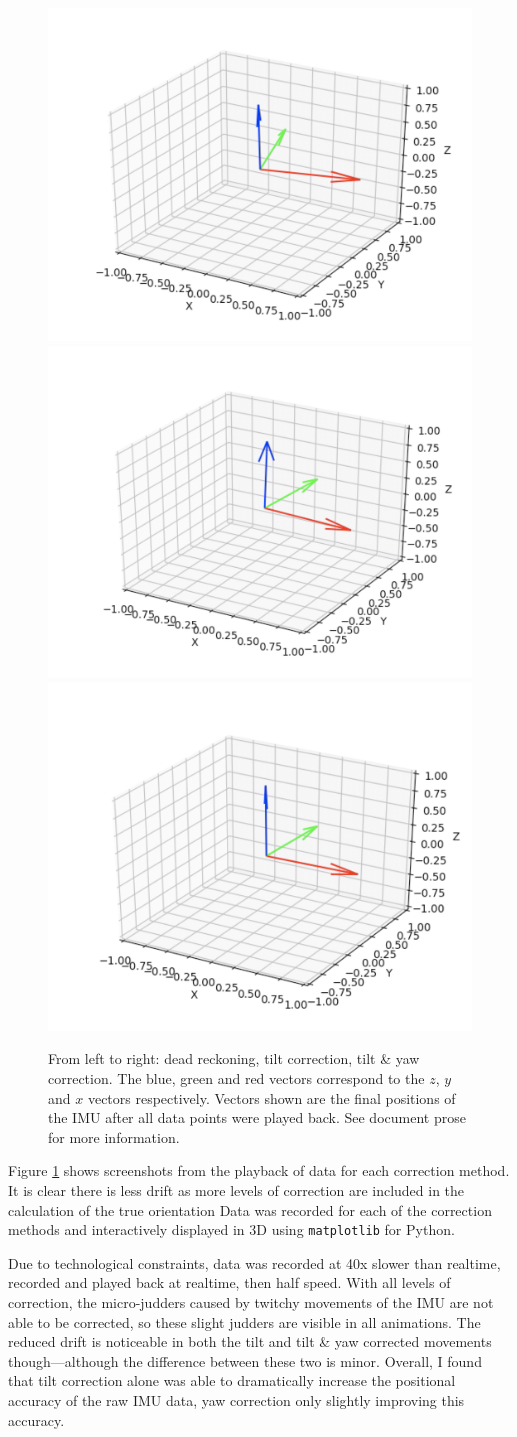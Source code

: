 \documentclass[11pt]{article}
\begin{document}
\begin{figure}[htp]

\centering
\includegraphics[width=.32\textwidth]{4gyro_after}\hfill
\includegraphics[width=.32\textwidth]{5acc_after}\hfill
\includegraphics[width=.32\textwidth]{6mag_after}

\caption{From left to right: dead reckoning, tilt correction, tilt \& yaw correction. The blue, green and red vectors correspond to the $z$, $y$ and $x$ vectors respectively. Vectors shown are the final positions of the IMU after all data points were played back. See document prose for more information.}
\label{fig:3d}

\end{figure}

Figure \ref{fig:3d} shows screenshots from the playback of data for each correction method. It is clear there is less drift as more levels of correction are included in the calculation of the true orientation Data was recorded for each of the correction methods and interactively displayed in 3D using \texttt{matplotlib} for Python. 

Due to technological constraints, data was recorded at 40x slower than realtime, recorded and played back at realtime, then half speed. With all levels of correction, the micro-judders caused by twitchy movements of the IMU are not able to be corrected, so these slight judders are visible in all animations. The reduced drift is noticeable in both the tilt and tilt \& yaw corrected movements though---although the difference between these two is minor. Overall, I found that tilt correction alone was able to dramatically increase the positional accuracy of the raw IMU data, yaw correction only slightly improving this accuracy.
\end{document}
